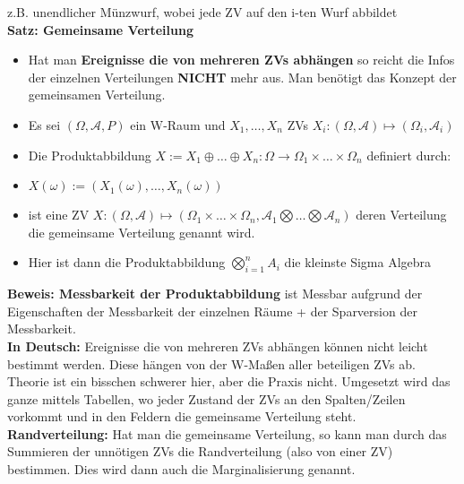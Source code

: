 \documentclass[a4paper,11pt]{scrartcl}
\begin{document}
z.B. unendlicher Münzwurf, wobei jede ZV auf den i-ten Wurf abbildet \\

\textbf{Satz: Gemeinsame Verteilung}

\begin{itemize}
    \item Hat man \textbf{Ereignisse die von mehreren ZVs abhängen} so reicht die Infos der einzelnen Verteilungen \textbf{NICHT} mehr aus. 
    Man benötigt das Konzept der gemeinsamen Verteilung.
    \item Es sei $(\Omega, \mathcal{A}, P)$ ein W-Raum und $X_1, \dots, X_n$ ZVs $X_i: (\Omega, \mathcal{A}) \mapsto (\Omega_i,\mathcal{A}_i)$
    \item Die Produktabbildung $X := X_1 \oplus \dots \oplus X_n: \Omega \rightarrow \Omega_1 \times \dots \times \Omega_n$ definiert durch:
    \item $X(\omega) := (X_1(\omega),\dots,X_n(\omega))$ 
    \item ist eine ZV $X: (\Omega,\mathcal{A}) \mapsto (\Omega_1 \times \dots \times \Omega_n, \mathcal{A}_1 \bigotimes \dots \bigotimes  \mathcal{A}_n)$ deren Verteilung die gemeinsame Verteilung genannt wird.
    \item Hier ist dann die Produktabbildung $\bigotimes^n_{i = 1} A_i$ die kleinste Sigma Algebra
\end{itemize}

\textbf{Beweis: Messbarkeit der Produktabbildung}
ist Messbar aufgrund der Eigenschaften der Messbarkeit der einzelnen Räume + der Sparversion der Messbarkeit.\\

\textbf{In Deutsch:} 
Ereignisse die von mehreren ZVs abhängen können nicht leicht bestimmt werden. 
Diese hängen von der W-Maßen aller beteiligen ZVs ab. 
Theorie ist ein bisschen schwerer hier, aber die Praxis nicht. 
Umgesetzt wird das ganze mittels Tabellen, wo jeder Zustand der ZVs an den Spalten/Zeilen vorkommt und in den Feldern die gemeinsame Verteilung steht.\\

\textbf{Randverteilung:}
Hat man die gemeinsame Verteilung, so kann man durch das Summieren der unnötigen ZVs die Randverteilung (also von einer ZV) bestimmen.
Dies wird dann auch die Marginalisierung genannt.\\
\end{document}
